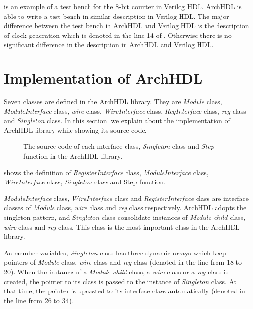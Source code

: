 is an example of a test bench for the 8-bit counter in Verilog HDL.
ArchHDL is able to write a test bench in similar description in Verilog HDL.
The major difference between the test bench in ArchHDL and Verilog HDL is the description of clock generation which is denoted in the line 14 of .
Otherwise there is no significant difference in the description in ArchHDL and Verilog HDL.

\section{Implementation of ArchHDL} \label{ss:implementation}

Seven classes are defined in the ArchHDL library.
They are \textit{Module} class, \textit{ModuleInterface} class, \textit{wire} class, \textit{WireInterface} class, \textit{RegInterface} class, \textit{reg} class and \textit{Singleton} class.
In this section, we explain about the implementation of ArchHDL library while showing its source code.

\begin{figure}[p]
 
 \caption{The source code of each interface class, \textit{Singleton} class and \textit{Step} function in the ArchHDL library.}
 \label{src:class_singleton}
\end{figure}

 shows the definition of \textit{RegisterInterface} class, \textit{ModuleInterface} class, \textit{WireInterface} class, \textit{Singleton} class and Step function.

\textit{ModuleInterface} class, \textit{WireInterface} class and \textit{RegisterInterface} class are interface classes of \textit{Module} class, \textit{wire} class and \textit{reg} class respectively.
ArchHDL adopts the singleton pattern, and \textit{Singleton} class consolidate instances of \textit{Module child} class, \textit{wire} class and \textit{reg} class.
This class is the most important class in the ArchHDL library.

As member variables, \textit{Singleton} class has three dynamic arrays which keep pointers of \textit{Module} class, \textit{wire} class and \textit{reg} class (denoted in the line from 18 to 20).
When the instance of a \textit{Module child} class, a \textit{wire} class or a \textit{reg} class is created, the pointer to its class is passed to the instance of \textit{Singleton} class.
At that time, the pointer is upcasted to its interface class automatically (denoted in the line from 26 to 34).

